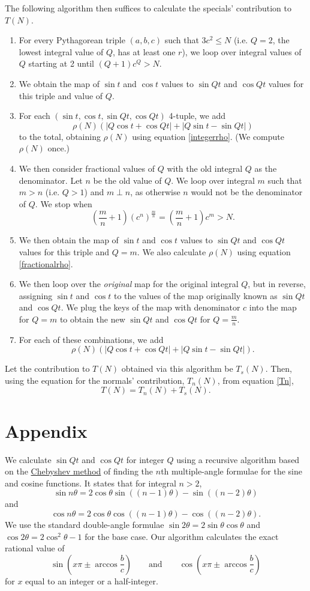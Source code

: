 \documentclass[12pt]{article}
\begin{document}
The following algorithm then suffices to calculate the specials' contribution to $T(N)$.
\begin{enumerate}
  \item For every Pythagorean triple $(a, b, c)$ such that $3c^2 \le N$ (i.e. $Q=2$, the lowest integral value of $Q$, has at least one $r$), we loop over integral values of $Q$ starting at 2 until $(Q+1)c^Q > N$.
  \item We obtain the map of $\sin t$ and $\cos t$ values to $\sin Qt$ and $\cos Qt$ values for this triple and value of $Q$.
  \item For each $(\sin t, \cos t, \sin Qt, \cos Qt)$ 4-tuple, we add \[ \rho(N)(|Q\cos t + \cos Qt| + |Q\sin t - \sin Qt|) \] to the total, obtaining $\rho(N)$ using equation \ref{integerrho}. (We compute $\rho(N)$ once.)
  \item We then consider fractional values of $Q$ with the old integral $Q$ as the denominator. Let $n$ be the old value of $Q$. We loop over integral $m$ such that $m > n$ (i.e. $Q > 1$) and $m \perp n$, as otherwise $n$ would not be the denominator of $Q$. We stop when \[ \left( \frac{m}{n} + 1 \right) (c^n)^\frac{m}{n} = \left( \frac{m}{n} + 1 \right) c^m > N. \]
  \item We then obtain the map of $\sin t$ and $\cos t$ values to $\sin Qt$ and $\cos Qt$ values for this triple and $Q = m$. We also calculate $\rho(N)$ using equation \ref{fractionalrho}.
  \item We then loop over the \textit{original} map for the original integral $Q$, but in reverse, assigning $\sin t$ and $\cos t$ to the values of the map originally known as $\sin Qt$ and $\cos Qt$. We plug the keys of the map with denominator $c$ into the map for $Q = m$ to obtain the new $\sin Qt$ and $\cos Qt$ for $Q = \frac{m}{n}$.
  \item For each of these combinations, we add \[ \rho(N)(|Q\cos t + \cos Qt| + |Q\sin t - \sin Qt|). \]
\end{enumerate}
Let the contribution to $T(N)$ obtained via this algorithm be $T_s(N)$. Then, using the equation for the normals' contribution, $T_n(N)$, from equation \ref{Tn}, \[ T(N) = T_n(N) + T_s(N). \]

\section{Appendix}

We calculate $\sin Qt$ and $\cos Qt$ for integer $Q$ using a recursive algorithm based on the \href{https://en.wikipedia.org/wiki/List_of_trigonometric_identities#Chebyshev_method}{Chebyshev method} of finding the $n$th multiple-angle formulae for the sine and cosine functions. It states that for integral $n > 2$, \[ \sin n\theta = 2\cos\theta \sin((n-1)\theta) - \sin((n-2)\theta) \] and \[ \cos n\theta = 2\cos\theta\cos((n-1)\theta) - \cos((n-2)\theta). \]
We use the standard double-angle formulae $\sin 2\theta = 2\sin\theta\cos\theta$ and $\cos 2\theta = 2\cos^2\theta - 1$ for the base case. Our algorithm calculates the exact rational value of \[ \sin\left(x\pi \pm \arccos\frac{b}{c}\right) \qquad \text{and} \qquad \cos\left(x\pi \pm \arccos\frac{b}{c}\right) \] for $x$ equal to an integer or a half-integer.
\end{document}
